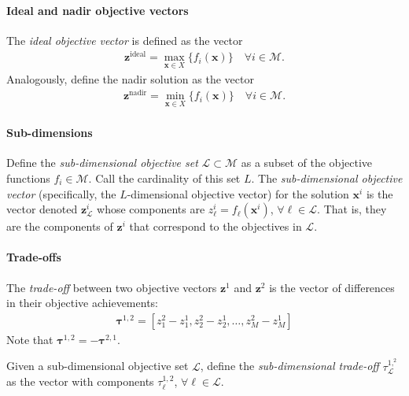 \paragraph{Ideal and nadir objective vectors}
The \textit{ideal objective vector} is defined as the vector
\begin{align}
\mathbf{z}^{\text{ideal}} = \max_{\mathbf{x} \in X}\{f_i(\mathbf{x})\} \quad \forall i \in \mathcal{M}.
\end{align}
Analogously, define the nadir solution as the vector
\begin{align}
\mathbf{z}^{\text{nadir}} = \min_{\mathbf{x} \in X}\{f_i(\mathbf{x})\} \quad \forall i \in \mathcal{M}.
\end{align}


\paragraph{Sub-dimensions} Define the \textit{sub-dimensional objective set} $\mathcal{L} \subset \mathcal{M}$ as a subset of the objective functions $f_i \in \mathcal{M}$. Call the cardinality of this set $L$. The \textit{sub-dimensional objective vector} (specifically, the $L$-dimensional objective vector) for the solution $\mathbf{x}^i$ is the vector denoted $\mathbf{z}^i_\mathcal{L}$ whose components are $z^i_\ell = f_\ell(\mathbf{x}^i)$, $\forall \ell \in \mathcal{L}$. That is, they are the components of $\mathbf{z}^i$ that correspond to the objectives in $\mathcal{L}$.

\paragraph{Trade-offs}
The \textit{trade-off} between two objective vectors $\mathbf{z}^1$ and $\mathbf{z}^2$ is the vector of differences in their objective achievements:
\begin{align}
\mathbf{\tau}^{1,2} = [z^2_1 - z^1_1, z^2_2 - z^1_2, \ldots, z^2_M - z^1_M]
\end{align}
Note that $\mathbf{\tau}^{1,2} = - \mathbf{\tau}^{2,1}$.

Given a sub-dimensional objective set $\mathcal{L}$, define the \textit{sub-dimensional trade-off} $\tau^{1,^2}_\mathcal{L}$ as the vector with components $\tau^{1,2}_\ell$, $\forall \ell \in \mathcal{L}$.

